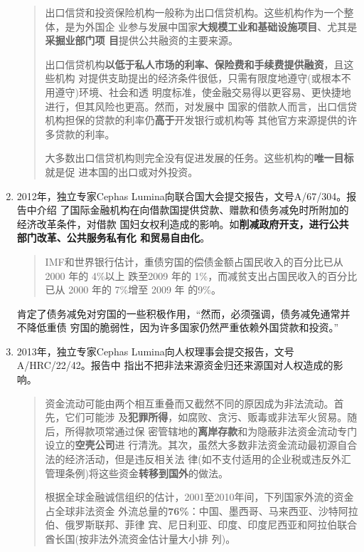 \begin{enumerate}
\begin{quotation}
    出口信贷和投资保险机构一般称为出口信贷机构。这些机构作为一个整体，是为外国企
    业参与发展中国家\textbf{大规模工业和基础设施项目}、尤其是\textbf{采掘业部门项
      目}提供公共融资的主要来源。

    出口信贷机构\textbf{以低于私人市场的利率、保险费和手续费提供融资}，且这些机构
    对提供支助提出的经济条件很低，只需有限度地遵守(或根本不用遵守)环境、社会和透
    明度标准，使金融交易得以更容易、更快捷地进行，但其风险也更高。然而，对发展中
    国家的借款人而言，出口信贷机构担保的贷款的利率仍\textbf{高于}开发银行或机构等
    其他官方来源提供的许多贷款的利率。

    大多数出口信贷机构则完全没有促进发展的任务。这些机构的\textbf{唯一目标}就是促
    进本国的出口或对外投资。
  \end{quotation}

\item 2012年，独立专家Cephas Lumina向联合国大会提交报告，文号A/67/304。报告中介绍
  了国际金融机构在向借款国提供贷款、赠款和债务减免时所附加的经济改革条件，对借款
  国妇女权利造成的影响。如\textbf{削减政府开支，进行公共部门改革、公共服务私有化
    和贸易自由化}。
  \begin{quotation}
    IMF和世界银行估计，重债穷国的偿债金额占国民收入的百分比已从 2000 年的 4\%以上
    跌至2009 年的 1\%，而减贫支出占国民收入的百分比已从 2000 年的 7\%增至 2009 年
    的9\%。
  \end{quotation}
  肯定了债务减免对穷国的一些积极作用，``然而，必须强调，债务减免通常并不降低重债
  穷国的脆弱性，因为许多国家仍然严重依赖外国贷款和投资。''

\item 2013年，独立专家Cephas Lumina向人权理事会提交报告，文号A/HRC/22/42。报告中
  指出不把非法来源资金归还来源国对人权造成的影响。
  \begin{quotation}
      
    资金流动可能由两个相互重叠而又截然不同的原因成为非法流动。首先，它们可能涉
    及\textbf{犯罪所得}，如腐败、贪污、贩毒或非法军火贸易。随后，所得款项常通过保
    密管辖地的\textbf{离岸存款}和为隐蔽非法资金流动专门设立的\textbf{空壳公司}进
    行清洗。其次，虽然大多数非法资金流动最初源自合法的经济活动，但是违反相关法
    律(如不支付适用的企业税或违反外汇管理条例)将这些资金\textbf{转移到国外}的做法。

    根据全球金融诚信组织的估计，2001至2010年间，下列国家外流的资金占全球非法资金
    外流总量的\textbf{76\%}：中国、墨西哥、马来西亚、沙特阿拉伯、俄罗斯联邦、菲律
    宾、尼日利亚、印度、印度尼西亚和阿拉伯联合酋长国(按非法外流资金估计量大小排
    列)。
\end{quotation}


\end{enumerate}
